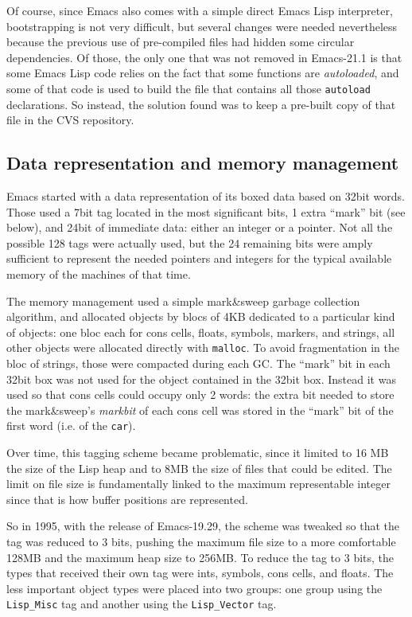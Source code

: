 \documentclass[format=acmsmall, review]{acmart}
\newcommand \Elisp {Emacs Lisp}
\begin{document}
Of course, since Emacs also comes with a simple direct \Elisp{} interpreter,
bootstrapping is not very difficult, but several changes were needed
nevertheless because the previous use of pre-compiled files had hidden some
circular dependencies.  Of those, the only one that was not removed in
Emacs-21.1 is that some \Elisp{} code relies on the fact that some
functions are \emph{autoloaded}, and some of that code is used to build the
file that contains all those \texttt{autoload} declarations.  So instead,
the solution found was to keep a pre-built copy of that file in the
CVS repository.

\subsection{Data representation and memory management}
\label{sec:data-representation}

Emacs started with a data representation of its boxed data based on 32bit
words.  Those used a 7bit tag located in the most significant bits, 1 extra
``mark'' bit (see below), and 24bit of immediate data: either an integer or
a pointer.  Not all the possible 128 tags were actually used, but the 24
remaining bits were amply sufficient to represent the needed pointers and
integers for the typical available memory of the machines of that time.

The memory management used a simple mark\&sweep garbage collection
algorithm, and allocated objects by blocs of 4KB dedicated to a particular
kind of objects: one bloc each for cons cells, floats, symbols, markers, and
strings, all other objects were allocated directly with \texttt{malloc}.
To avoid fragmentation in the bloc of strings, those were compacted during
each GC.  The ``mark'' bit in each 32bit box was not used for the object
contained in the 32bit box.  Instead it was used so that cons cells could
occupy only 2 words: the extra bit needed to store the mark\&sweep's
\emph{markbit} of each cons cell was stored in the ``mark'' bit of the first
word (i.e. of the \texttt{car}).

Over time, this tagging scheme became problematic, since it limited to 16 MB
the size of the Lisp heap and to 8MB the size of files that could be edited.
The limit on file size is fundamentally linked to the maximum representable
integer since that is how buffer positions are represented.

So in 1995, with the release of Emacs-19.29,
the scheme was tweaked so that the tag was reduced to
3 bits, pushing the maximum file size to a more comfortable 128MB and the
maximum heap size to 256MB.  To reduce the tag to 3 bits,
the types that received their own tag were ints, symbols, cons cells, and floats.
The less important
object types were placed into two groups: one group using the
\texttt{Lisp\_Misc} tag and another using the \texttt{Lisp\_Vector}
tag.
\end{document}
